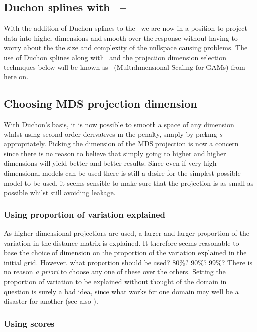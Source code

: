 \subsection{Duchon splines with \mdsap\ -- \mdsds}

With the addition of Duchon splines to the \mdsap\ we are now in a position to project data into higher dimensions and smooth over the response without having to worry about the the size and complexity of the nullspace causing problems. The use of Duchon splines along with \mdsap\ and the projection dimension selection techniques below will be known as \mdsds\ (Multidimensional Scaling for GAMs) from here on.

\subsection{Choosing MDS projection dimension}

With Duchon's basis, it is now possible to smooth a space of any dimension whilst using second order derivatives in the penalty, simply by picking $s$ appropriately. Picking the dimension of the MDS projection is now a concern since there is no reason to believe that simply going to higher and higher dimensions will yield better and better results. Since even if very high dimensional models can be used there is still a desire for the simplest possible model to be used, it seems sensible to make sure that the projection is as small as possible whilst still avoiding leakage.

\subsubsection{Using proportion of variation explained}

As higher dimensional projections are used, a larger and larger proportion of the variation in the distance matrix is explained. It therefore seems reasonable to base the choice of dimension on the proportion of the variation explained in the initial grid. However, what proportion should be used? 80\%? 90\%? 99\%? There is no reason \textit{a priori} to choose any one of these over the others. Setting the proportion of variation to be explained without thought of the domain in question is surely a bad idea, since what works for one domain may well be a disaster for another (see also ).

\subsubsection{Using scores}

